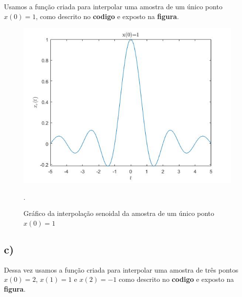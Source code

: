 \documentclass[a4paper, 12pt]{article}
\begin{document}
Usamos a função criada para interpolar uma amostra de um único ponto $x(0)=1$, como descrito no \textbf{codigo} e exposto na \textbf{figura}.



\begin{figure}[H]
	\centering
	\includegraphics[scale=0.6]{../Imagens/ex6/b.jpg} 
	\caption{Gráfico da interpolação senoidal da amostra de um único ponto $x(0)=1$}.
	\label{fig:1a}
\end{figure}

\subsection{c)}

Dessa vez usamos a função criada para interpolar uma amostra de três pontos $x(0)=2$, $x(1)=1$ e $x(2)=-1$ como descrito no \textbf{codigo} e exposto na \textbf{figura}.


\end{document}
